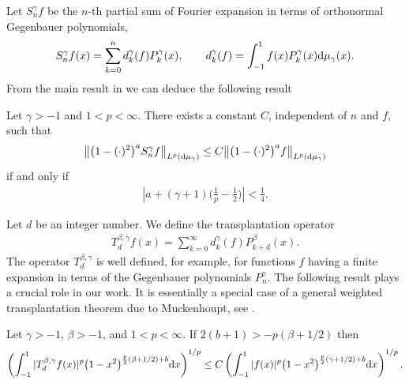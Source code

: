 Let $S_n^{\gamma}f$ be the $n$-th partial sum of Fourier expansion in terms of orthonormal Gegenbauer polynomials,
\begin{gather*}
S_n^{\gamma}f(x)=\sum_{k=0}^n d_k^{\gamma}(f)P_k^{\gamma}(x),\qquad d_k^{\gamma}(f)=\int_{-1}^1 f(x)P_k^{\gamma}(x) {\rm d}\mu_{\gamma}(x).
\end{gather*}
From the main result in \cite{muckenhoupt1} we can deduce the following result
\begin{lem}\label{acotacion}
	Let $\gamma>-1$ and $1<p<\infty$. There exists a constant $C$, independent of $n$ and $f$, such that
	\begin{gather*}
	\big\|\big(1-(\cdot)^2\big)^a S^{\gamma}_nf\big\|_{L^p({\rm d}\mu_{\gamma})}\le C\big\|\big(1-(\cdot)^2\big)^a f\big\|_{L^p ({\rm d}\mu_{\gamma})}
	\end{gather*}
	if and only if
	\begin{gather*}%
	\left|a+(\gamma+1)\bigg(\frac{1}{p}-\frac{1}{2}\bigg)\right|<\frac{1}{4}.
	\end{gather*}
\end{lem}

Let $d$ be an integer number. We define the transplantation operator
\begin{gather*}
T_{d}^{\beta,\gamma}f(x)=\sum_{k=0}^{\infty}d_k^{\gamma}(f)P_{k+d}^{\beta}(x).
\end{gather*}
The operator $T_{d}^{\beta,\gamma}$ is well defined, for example, for functions $f$ having a finite expansion in terms of the Gegenbauer polynomials $P_n^\gamma$. The following result plays a crucial role in our work. It is essentially a special case of a general weighted transplantation theorem due to Muckenhoupt, see \cite[Theorem 1.6]{muckenhoupt}.

\begin{lem}\label{mukchenhoupt}
	Let $\gamma>-1$, $\beta>-1$, and $1<p<\infty$. If $2(b+1)>-p(\beta+1/2)$ then	
	\begin{gather*}%
	\left(\int_{-1}^{1}|T_{d}^{\beta,\gamma}f(x)|^p\big(1-x^2\big)^{\frac{p}{2}(\beta+1/2)+b} {\rm d}x\right)^{1/p} \le C\left(\int_{-1}^{1}|f(x)|^p\big(1-x^2\big)^{\frac{p}{2}(\gamma+1/2)+b} {\rm d}x\right)^{1/p}.
	\end{gather*}
\end{lem}

